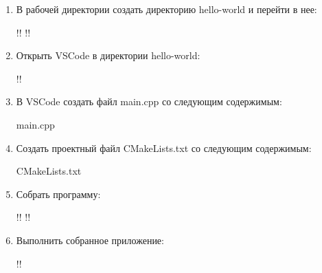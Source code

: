 \documentclass[14pt]{extarticle}
\begin{document}
\begin{enumerate}

        \item В рабочей директории создать директорию hello-world и перейти в нее:
            \vspace{2mm}

            \begin{consolewindow}[\normalsize]
!!
!!
            \end{consolewindow}

        \item Открыть VSCode в директории hello-world:
            \vspace{2mm}

            \begin{consolewindow}[\normalsize]
!!
            \end{consolewindow}

        \item В VSCode создать файл main.cpp со следующим содержимым:
            \vspace{2mm}

                {main.cpp}

        \item Создать проектный файл CMakeLists.txt со следующим содержимым:
            \vspace{2mm}

                {CMakeLists.txt}

        \item Собрать программу:
            \vspace{2mm}

            \begin{consolewindow}[\normalsize]
!!
!!
            \end{consolewindow}

        \item Выполнить собранное приложение:
            \vspace{2mm}

            \begin{consolewindow}[\normalsize]
!!
            \end{consolewindow}

\end{enumerate}
\end{document}
